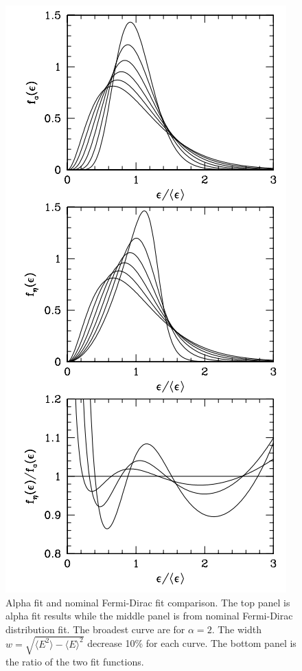 \begin{figure}
\centering
\includegraphics[width=\columnwidth]{chapters/assets/solar/neutrino_spectra_sn_simulations.png}
\caption{Alpha fit and nominal Fermi-Dirac fit comparison. The top panel is alpha fit results while the middle panel is from nominal Fermi-Dirac distribution fit. The broadest curve are for $\alpha=2$. The width $w=\sqrt{\langle E^2 \rangle - \langle E\rangle^2}$ decrease 10\% for each curve. The bottom panel is the ratio of the two fit functions.}
\label{fig:neutrino_spectra_sn_simulations}
\end{figure}



